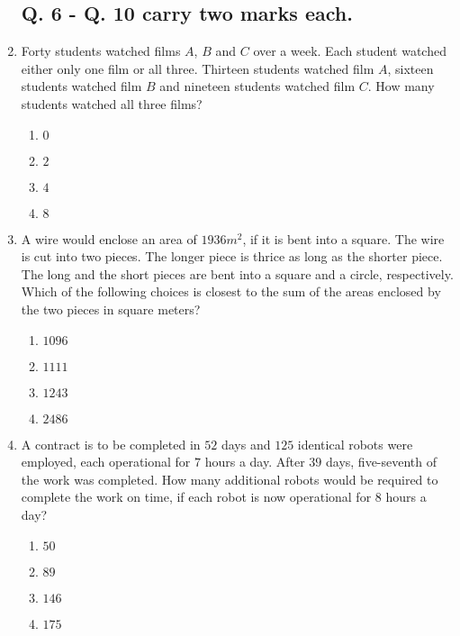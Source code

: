 \documentclass[journal,12pt,onecolumn]{IEEEtran}
\theoremstyle{remark}
\begin{document}
\begin{enumerate}
\subsection{\textbf{Q. 6 - Q. 10 carry two marks each.}}
\item Forty students watched films $A$, $B$ and $C$ over a week. Each student watched either only
one film or all three. Thirteen students watched film $A$, sixteen students watched film $B$
and nineteen students watched film $C$. How many students watched all three films?
\begin{multicols}{4}
    \begin{enumerate}
        \item $0$ \item $2$ \item $4$ \item $8$
    \end{enumerate}
\end{multicols}
\item A wire would enclose an area of $1936 m^2$, if it is bent into a square. The wire is cut into
two pieces. The longer piece is thrice as long as the shorter piece. The long and the short
pieces are bent into a square and a circle, respectively. Which of the following choices is
closest to the sum of the areas enclosed by the two pieces in square meters?
\begin{multicols}{4}
    \begin{enumerate}
        \item  $1096$ \item  $1111$ \item  $1243$ \item  $2486$
    \end{enumerate}
\end{multicols}
\item A contract is to be completed in $52$ days and $125$ identical robots were employed, each
operational for $7$ hours a day. After $39$ days, five-seventh of the work was completed. How
many additional robots would be required to complete the work on time, if each robot is
now operational for $8$ hours a day?
\begin{multicols}{4}
    \begin{enumerate}
        \item $50$
        \item $89$
        \item $146$
        \item $175$
    \end{enumerate}

\end{multicols}
\end{enumerate}
\end{document}
